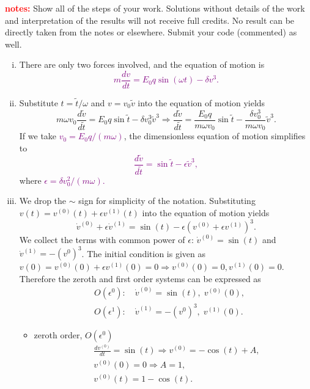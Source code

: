 \documentclass[12pt]{article}
\begin{document}
\begin{ex}
\noindent\textbf{\textcolor{red}{notes:} }Show all of the steps of your work. Solutions without details of the work and interpretation of the results will not receive full credits. No result can be directly taken from the notes or elsewhere. Submit your code (commented) as well.

\begin{solution}
  \begin{enumerate}[(i)]\setlength{\itemsep}{0pt}
  \item There are only two forces involved, and the equation of motion is
    \textcolor{purple}{$$m\frac{dv}{dt}=E_0q\sin(\omega t)-\delta v^3.$$}
  \item Substitute $t=\tilde{t}/\omega$ and $v=v_0\tilde{v}$ into the equation of motion yields
    $$m\omega v_0\frac{d\tilde{v}}{d\tilde{t}}=E_0q\sin{\tilde{t}}-\delta v_0^3\tilde{v}^3\Rightarrow\frac{d\tilde{v}}{d\tilde{t}}=\frac{E_0q}{m\omega v_0}\sin{\tilde{t}}-\frac{\delta v_0^3}{m\omega v_0}\tilde{v}^3.$$
    If we take \textcolor{purple}{$v_0=E_0q/(m\omega)$}, the dimensionless equation of motion simplifies to
    \textcolor{purple}{$$\frac{d\tilde{v}}{d\tilde{t}}=\sin{\tilde{t}}-\epsilon\tilde{v}^3,$$}
    where \textcolor{purple}{$\epsilon=\delta v_0^2/(m\omega)$.}
  \item We drop the $\sim$ sign for simplicity of the notation. Substituting $v(t)=v^{(0)}(t)+\epsilon v^{(1)}(t)$ into the equation of motion yields
    $$\dot{v}^{(0)}+\epsilon\dot{v}^{(1)}=\sin(t)-\epsilon\left(v^{(0)}+\epsilon v^{(1)}\right)^3.$$
    We collect the terms with common power of $\epsilon$: $\dot{v}^{(0)}=\sin(t)$ and $\dot{v}^{(1)}=-\left(v^{0}\right)^3$. The initial condition is given as $v(0)=v^{(0)}(0)+\epsilon v^{(1)}(0)=0\Rightarrow v^{(0)}(0)=0,v^{(1)}(0)=0$. Therefore the zeroth and first order systems can be expressed as
    \begin{align*}
      &O(\epsilon^0):\quad \dot{v}^{(0)}=\sin(t),\;v^{(0)}(0),\\
      &O(\epsilon^1):\quad \dot{v}^{(1)}=-\left(v^{0}\right)^3,\;v^{(1)}(0).
    \end{align*}
    \begin{itemize}
    \item zeroth order, $O(\epsilon^0)$
      \begin{align*}
        &\frac{dv^{(0)}}{dt}=\sin(t)\Rightarrow v^{(0)}=-\cos(t)+A,\\
        &v^{(0)}(0)=0\Rightarrow A=1,\\
        &v^{(0)}(t)=1-\cos(t).
      \end{align*}

\end{itemize}
\end{enumerate}
\end{solution}
\end{ex}
\end{document}
